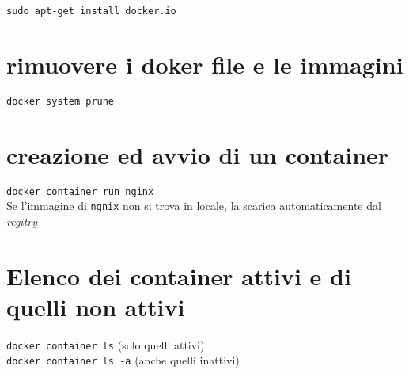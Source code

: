 \documentclass[12pt,a4paper]{report}
\newcommand{\nota}[2]{%
	\marginpar[{\raggedleft\tiny\sffamily #1\\}]{%
		{\raggedright\tiny\sffamily #1\\}}}
\begin{document}
	\verb|sudo apt-get install docker.io|
	\section{rimuovere i doker file e le immagini}
	\verb|docker system prune|
	\section{creazione ed avvio di un container}
	\verb|docker container run nginx|\\
	Se l'immagine di \verb|ngnix| non si trova in locale, la scarica automaticamente dal \textit{regitry}  
	\section{Elenco dei container attivi e di quelli non attivi}
	\verb|docker container ls| (solo quelli attivi)\\
	\verb|docker container ls -a| (anche quelli inattivi)
	
	
\end{document}
